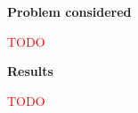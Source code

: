 \documentclass{article}
\begin{document}
\cfoot{}

\textbf{Problem considered}

\textcolor{red}{TODO}

\textbf{Results}

\textcolor{red}{TODO}
\end{document}
